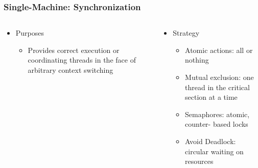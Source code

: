 \begin{frame}[plain,t]
	\frametitle{Single-Machine: Synchronization }
	\begin{columns}[t]
		\begin{column}{.5\textwidth}
			
			\begin{itemize}\Large
				\item Purposes
				\begin{itemize}\large
					\item Provides correct
					execution or
					coordinating threads
					in the face of
					arbitrary context
					switching
					
				\end{itemize}
			\end{itemize}
			
		\end{column}\pause
		
		\begin{column}{.5\textwidth}
			
			\begin{itemize}\Large
				\item Strategy
				\begin{itemize}\large
					\item Atomic actions: all or nothing
					\item Mutual exclusion: one thread in the
					critical section at a time
					\item Semaphores: atomic, counter-
					based locks
					\item Avoid Deadlock: circular waiting on
					resources
					
				\end{itemize}
			\end{itemize}
			
		\end{column}
	\end{columns}
\end{frame}

